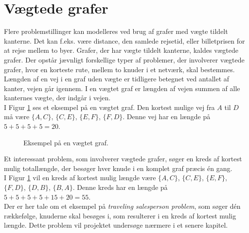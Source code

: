 \section{Vægtede grafer}

Flere problemstillinger kan modelleres ved brug af grafer med vægte tildelt kanterne. 
Det kan f.eks. være distance, den samlede rejsetid, eller billetprisen for at rejse mellem to byer. 
Grafer, der har vægte tildelt kanterne, kaldes vægtede grafer. 
Der opstår jævnligt forskellige typer af problemer, der involverer vægtede grafer, hvor en korteste rute, mellem to knuder i et netværk, skal bestemmes. 
Længden af en vej i en graf uden vægte er tidligere betegnet ved antallet af kanter, vejen går igennem.
I en vægtet graf er længden af vejen summen af alle kanternes vægte, der indgår i vejen. \\
I Figur \ref{fig:weighted_graph} ses et eksempel på en vægtet graf. Den kortest mulige vej fra $A$ til $D$ må være $\lbrace A,C \rbrace$, $\lbrace C,E \rbrace$, $\lbrace E,F \rbrace$, $\lbrace F,D \rbrace$. Denne vej har en længde på $5+5+5+5=20$. 

\begin{figure}[!h]
  \centering
  \caption{Eksempel på en vægtet graf.}
  \label{fig:weighted_graph}
\end{figure}

Et interessant problem, som involverer vægtede grafer, søger en kreds af kortest mulig totallængde, der besøger hver knude i en komplet graf præcis én gang. \\
I Figur \ref{fig:weighted_graph} vil en kreds af kortest mulig længde være $\lbrace A,C \rbrace$, $\lbrace C,E \rbrace$, $\lbrace E,F \rbrace$, $\lbrace F,D \rbrace$, $\lbrace D,B \rbrace$, $\lbrace B,A \rbrace$. Denne kreds har en længde på $5+5+5+5+15+20=55$. \\
Der er her tale om et eksempel på \emph{traveling salesperson problem}, som søger dén rækkefølge, knuderne skal besøges i, som resulterer i en kreds af kortest mulig længde. 
Dette problem vil projektet undersøge nærmere i et senere kapitel.

